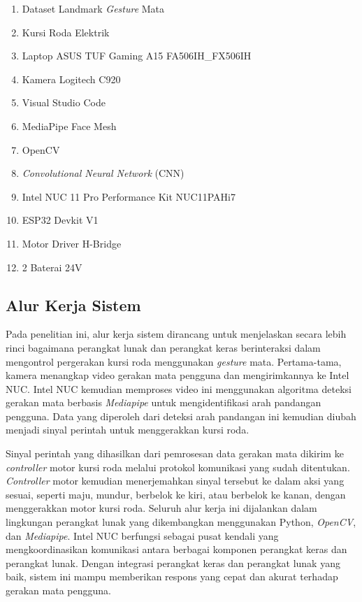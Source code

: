 \begin{enumerate}[itemsep=0cm] 
    \item Dataset Landmark \emph{Gesture} Mata
    \item Kursi Roda Elektrik
    \item Laptop ASUS TUF Gaming A15 FA506IH\_FX506IH
    \item Kamera Logitech C920
    \item Visual Studio Code
    \item MediaPipe Face Mesh
    \item OpenCV
    \item \textit{Convolutional Neural Network} (CNN)
    \item Intel NUC 11 Pro Performance Kit NUC11PAHi7
    \item ESP32 Devkit V1
    \item Motor Driver H-Bridge
    \item 2 Baterai 24V

\end{enumerate}

\subsection{Alur Kerja Sistem}
\label{sec:alur kerja}

Pada penelitian ini, alur kerja sistem dirancang untuk menjelaskan secara lebih rinci bagaimana perangkat lunak dan perangkat keras berinteraksi dalam mengontrol pergerakan kursi roda menggunakan \emph{gesture} mata. Pertama-tama, kamera menangkap video gerakan mata pengguna dan mengirimkannya ke Intel NUC. Intel NUC kemudian memproses video ini menggunakan algoritma deteksi gerakan mata berbasis \emph{Mediapipe} untuk mengidentifikasi arah pandangan pengguna. Data yang diperoleh dari deteksi arah pandangan ini kemudian diubah menjadi sinyal perintah untuk menggerakkan kursi roda.

Sinyal perintah yang dihasilkan dari pemrosesan data gerakan mata dikirim ke \emph{controller} motor kursi roda melalui protokol komunikasi yang sudah ditentukan. \emph{Controller} motor kemudian menerjemahkan sinyal tersebut ke dalam aksi yang sesuai, seperti maju, mundur, berbelok ke kiri, atau berbelok ke kanan, dengan menggerakkan motor kursi roda. Seluruh alur kerja ini dijalankan dalam lingkungan perangkat lunak yang dikembangkan menggunakan Python, \emph{OpenCV}, dan \emph{Mediapipe}. Intel NUC berfungsi sebagai pusat kendali yang mengkoordinasikan komunikasi antara berbagai komponen perangkat keras dan perangkat lunak. Dengan integrasi perangkat keras dan perangkat lunak yang baik, sistem ini mampu memberikan respons yang cepat dan akurat terhadap gerakan mata pengguna.

